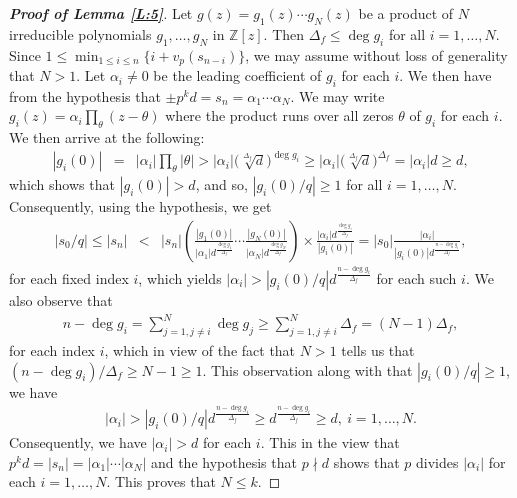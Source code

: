 \documentclass[10pt,a4paper]{amsart}
\begin{document}
\begin{proof}[\bf Proof of Lemma \ref{L:5}]
Let $g(z)=g_1(z)\cdots g_N(z)$ be a product of $N$ irreducible polynomials $g_1,\ldots,g_N$ in $\mathbb{Z}[z]$. Then $\Delta_f\leq \deg g_i$ for all $i=1,\ldots,N$. Since $1\leq \min_{1\leq i\leq n}\{i+v_p(s_{n-i})\}$, we may assume without loss of generality that $N>1$. Let $\alpha_i\neq 0$ be the leading coefficient of $g_i$ for each $i$. We then have from the hypothesis that $\pm p^kd=s_n=\alpha_1\cdots \alpha_N$. We may write $g_i(z)=\alpha_i\prod_{\theta}(z-\theta)$ where the product runs over all zeros $\theta$ of $g_i$ for each $i$. We then arrive at the following:
\begin{eqnarray*}
|g_i(0)| &=& |\alpha_i|\prod_{\theta}|\theta|>  |\alpha_i|\bigl(\sqrt[\Delta_f]{d}\bigr)^{\deg g_i}\geq |\alpha_i|\bigl(\sqrt[\Delta_f]{d}\bigr)^{\Delta_f}=|\alpha_i|d\geq d,
\end{eqnarray*}
which shows that $|g_i(0)|>d$, and so, $|g_i(0)/q|\geq 1$ for all $i=1,\ldots, N$. Consequently, using the hypothesis, we get
\begin{eqnarray*}
|s_0/q| \leq |s_n|&<&|s_n|\left({\frac{|g_1(0)|}{|\alpha_1|d^{\frac{\deg g_1}{\Delta_f}}}\cdots \frac{|g_N(0)|}{|\alpha_N|d^{\frac{\deg g_N}{\Delta_f}}}}\right)\times \frac{|\alpha_i|d^{\frac{\deg g_i}{\Delta_f}}}{|g_i(0)|}
= |s_0|\frac{|\alpha_i|}{|g_i(0)|d^{\frac{n-\deg g_i}{\Delta_f}}},
\end{eqnarray*}
for each fixed index $i$, which yields $|\alpha_i|> |g_i(0)/q|d^{\frac{n-\deg g_i}{\Delta_f}}$ for each such $i$. We also
observe that
\begin{eqnarray*}
n-\deg g_i=\sum_{j=1,j\neq i}^{N} \deg g_j\geq \sum_{j=1,j\neq i}^{N}\Delta_f=(N-1)\Delta_f,
\end{eqnarray*}
for each index $i$, which in view of the fact that $N>1$ tells us that $(n-\deg g_i)/\Delta_f\geq N-1\geq 1$. This observation along with that $|g_i(0)/q|\geq 1$, we have
\begin{eqnarray*}
|\alpha_i|>|g_i(0)/q|d^{\frac{n-\deg g_i}{\Delta_f}}\geq d^{\frac{n-\deg g_i}{\Delta_f}}\geq d,~i=1,\ldots,N.
\end{eqnarray*}
Consequently, we have $|\alpha_i|>d$ for each $i$. This in the view that $p^k d=|s_n|=|\alpha_1|\cdots |\alpha_N|$ and the hypothesis that $p\nmid d$ shows that $p$ divides $|\alpha_i|$ for each $i=1,\ldots, N$. This proves that $N\leq k$.


\end{proof}
\end{document}
